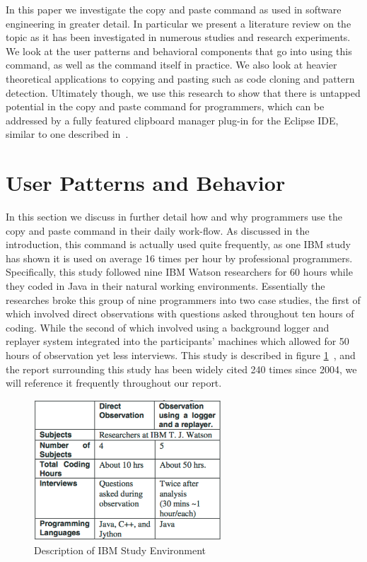 \documentclass{acm_proc_article-sp}
\begin{document}
In this paper we investigate the copy and paste command as used in software engineering in greater detail. In particular we present a literature review on the topic as it has been investigated in numerous studies and research experiments. We look at the user patterns and behavioral components that go into using this command, as well as the command itself in practice. We also look at heavier theoretical applications to copying and pasting such as code cloning and pattern detection. Ultimately though, we use this research to show that there is untapped potential in the copy and paste command for programmers, which can be addressed by a fully featured clipboard manager plug-in for the Eclipse IDE, similar to one described in~\cite{ooplCP}.

\section{User Patterns and Behavior}\label{sec:patterns}

In this section we discuss in further detail how and why programmers use the copy and paste command in their daily work-flow. As discussed in the introduction, this command is actually used quite frequently, as one IBM study has shown it is used on average 16 times per hour by professional programmers. Specifically, this study followed nine IBM Watson researchers for 60 hours while they coded in Java in their natural working environments. Essentially the researches broke this group of nine programmers into two case studies, the first of which involved direct observations with questions asked throughout ten hours of coding. While the second of which involved using a background logger and replayer system integrated into the participants' machines which allowed for 50 hours of observation yet less interviews. This study is described in figure \ref{fig:oopl}~\cite{ooplCP}, and the report surrounding this study has been widely cited 240 times since 2004, we will reference it frequently throughout our report.

\begin{figure}[h]
\centering
\includegraphics[width=7cm]{ooplStudy}
\caption{Description of IBM Study Environment}
\label{fig:oopl}
\end{figure}
\end{document}
